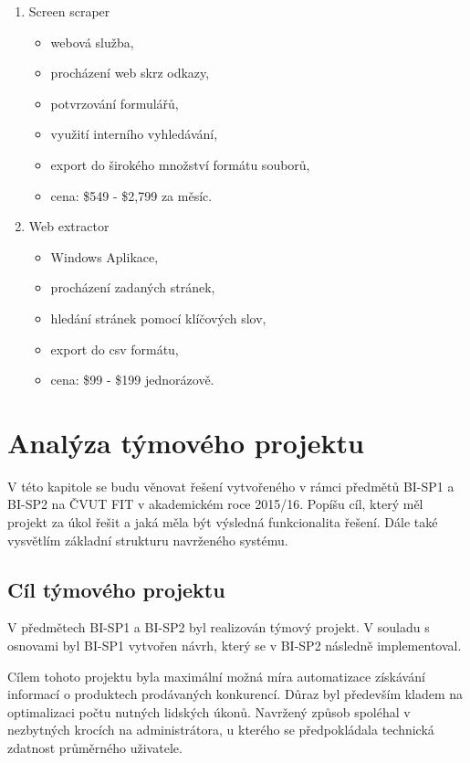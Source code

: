\documentclass[thesis=B,czech]{FITthesis}[2012/06/26]
\begin{document}
\begin{enumerate}
\item Screen scraper\cite{ScreenScraper}

  \begin{itemize}
    \item webová služba,
    \item procházení web skrz odkazy,
    \item potvrzování formulářů,
    \item využití interního vyhledávání,
    \item export do širokého množství formátu souborů,
    \item cena: \$549 - \$2,799 za měsíc.
  \end{itemize}
  
\item Web extractor\cite{WebExtractor}

  \begin{itemize}
    \item Windows Aplikace,
    \item procházení zadaných stránek,
    \item hledání stránek pomocí klíčových slov,
    \item export do csv formátu,
    \item cena: \$99 - \$199 jednorázově.
  \end{itemize}


\end{enumerate}

\newpage

\chapter{Analýza týmového projektu}
V této kapitole se budu věnovat řešení vytvořeného v rámci předmětů BI-SP1 a BI-SP2 na ČVUT FIT v akademickém roce 2015/16.
Popíšu cíl, který měl projekt za úkol řešit a jaká měla být výsledná funkcionalita řešení. Dále také vysvětlím základní strukturu
navrženého systému.

\section{Cíl týmového projektu}

V předmětech BI-SP1 a BI-SP2 byl realizován týmový projekt. V souladu s osnovami byl BI-SP1 vytvořen návrh, který
se v BI-SP2 následně implementoval.
\par
Cílem tohoto projektu byla maximální možná míra automatizace získávání informací o produktech prodávaných konkurencí. Důraz byl především kladem na optimalizaci počtu nutných lidských úkonů. Navržený způsob spoléhal v nezbytných krocích na administrátora, u kterého se předpokládala technická zdatnost průměrného uživatele.
\par
\end{document}
